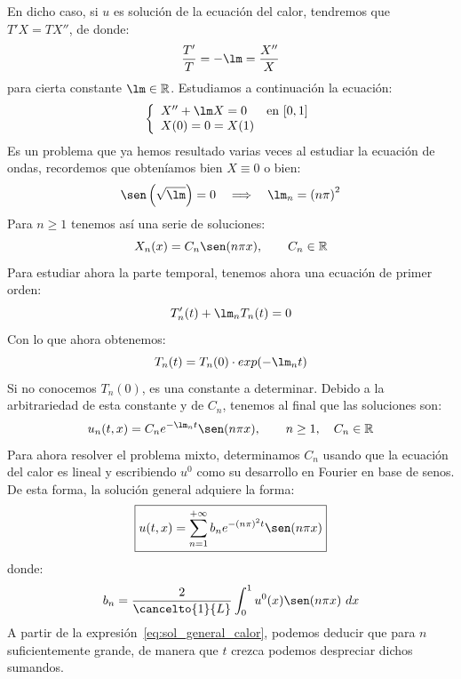 \noindent
En dicho caso, si $u$ es solución de la ecuación del calor, tendremos que $T'X = TX''$, de donde:
\begin{equation*}
    \frac{T'}{T} = -\lm = \frac{X''}{X}
\end{equation*}
para cierta constante $\lm\in \mathbb{R}$. Estudiamos a continuación la ecuación:
\begin{equation*}
    \left\{\begin{array}{ll}
            X'' + \lm X = 0 & \text{en\ } [0,1] \\
            X(0) = 0 = X(1)
    \end{array}\right.
\end{equation*}
Es un problema que ya hemos resultado varias veces al estudiar la ecuación de ondas, recordemos que obteníamos bien $X\equiv 0$ o bien:
\begin{equation*}
    \sen\left(\sqrt{\lm}\right) = 0 \quad\Longrightarrow\quad \lm_n = {(n\pi)}^{2}
\end{equation*}
Para $n\geq 1$ tenemos así una serie de soluciones:
\begin{equation*}
    X_n(x) = C_n\sen(n\pi x), \qquad C_n\in \mathbb{R}
\end{equation*}
Para estudiar ahora la parte temporal, tenemos ahora una ecuación de primer orden:
\begin{equation*}
    T_n'(t) + \lm_n T_n(t) = 0
\end{equation*}
Con lo que ahora obtenemos:
\begin{equation*}
    T_n(t) = T_n(0)\cdot exp(-\lm_n t)
\end{equation*}
Si no conocemos $T_n(0)$, es una constante a determinar. Debido a la arbitrariedad de esta constante y de $C_n$, tenemos al final que las soluciones son:
\begin{equation*}
    u_n(t,x) = C_n e^{-\lm_n t} \sen(n\pi x), \qquad n\geq 1, \quad C_n\in \mathbb{R}
\end{equation*}
Para ahora resolver el problema mixto, determinamos $C_n$ usando que la ecuación del calor es lineal y escribiendo $u^0$ como su desarrollo en Fourier en base de senos. De esta forma, la solución general adquiere la forma:
\begin{equation}\label{eq:sol_general_calor}
    \boxed{u(t,x) = \sum_{n=1}^{+\infty} b_ne^{-{(n\pi)}^{2}t}\sen(n\pi x)}
\end{equation}
donde:
\begin{equation*}
    b_n = \frac{2}{\cancelto{1}{L}}\int_{0}^{1} u^0(x)\sen(n\pi x)~dx 
\end{equation*}
A partir de la expresión~\eqref{eq:sol_general_calor}, podemos deducir que para $n$ suficientemente grande, de manera que $t$ crezca podemos despreciar dichos sumandos.\\

